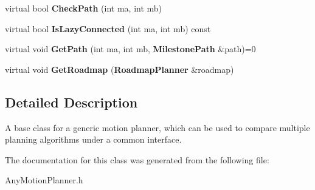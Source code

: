 \begin{DoxyCompactItemize}
\item 
virtual bool {\bfseries Check\+Path} (int ma, int mb)\label{classMotionPlannerInterface_a0b41ad29de6a0b40cc7366debad6033b}

\item 
virtual bool {\bfseries Is\+Lazy\+Connected} (int ma, int mb) const \label{classMotionPlannerInterface_abc2b3eef0c54453efcce0772b3dbae2e}

\item 
virtual void {\bfseries Get\+Path} (int ma, int mb, {\bf Milestone\+Path} \&path)=0\label{classMotionPlannerInterface_a4a56cbf7b39e78efaac721d042771d22}

\item 
virtual void {\bfseries Get\+Roadmap} ({\bf Roadmap\+Planner} \&roadmap)\label{classMotionPlannerInterface_adf19b2ff0687d9c3cb00938506ad54e5}

\end{DoxyCompactItemize}


\subsection{Detailed Description}
A base class for a generic motion planner, which can be used to compare multiple planning algorithms under a common interface. 

The documentation for this class was generated from the following file\+:\begin{DoxyCompactItemize}
\item 
Any\+Motion\+Planner.\+h\end{DoxyCompactItemize}
